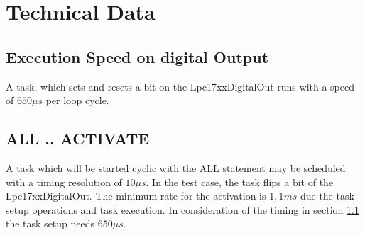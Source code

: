 \section{Technical Data}

\subsection{Execution Speed on digital Output}
\label{sec_lpc1768_bitflip}
A task, which sets and resets a bit on the Lpc17xxDigitalOut runs with
a speed of $650 \mu s$ per loop cycle.

\subsection{ALL .. ACTIVATE}
A task which will be started cyclic with the ALL statement may be scheduled 
with a timing resolution of $10 \mu s$. In the test case, the task 
flips a bit of the Lpc17xxDigitalOut. The minimum rate for the activation is 
$1,1 ms$ due the task setup operations and task execution.
In consideration of the timing in section \ref{sec_lpc1768_bitflip}
the task setup needs $650 \mu s$.


  
